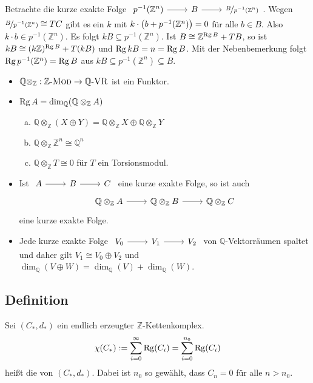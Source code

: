 Betrachte die kurze exakte Folge
$\begin{tikzcd}
	p^{-1}(\mathds{Z}^n) \rar & B \rar & \nicefrac{B}{p ^{-1}(\mathds{Z}^n)}
\end{tikzcd}$. 
Wegen $\nicefrac{B}{p ^{-1}(\mathds{Z}^n)} \cong T C$ gibt es ein
$k$ mit $k \cdot \enbrace*{b+ p ^{-1}(\mathds{Z}^n)} =0$ für alle $b \in B$. Also $k \cdot b \in p ^{-1}(\mathds{Z}^n)$. Es folgt 
$kB \subseteq  p ^{-1}(\mathds{Z}^n)$. Ist  $B \cong \mathds{Z}^{\Rg B}+ TB$, so ist $k B \cong (k \mathds{Z})^{\Rg B}+ T(kB)$ und $\Rg kB = n = \Rg B$. 
Mit der Nebenbemerkung folgt $\Rg p ^{-1}(\mathds{Z}^n) = \Rg B$ aus $kB \subseteq  p ^{-1}(\mathds{Z}^n) \subseteq B$. \bewende
{}
\begin{itemize}
	\item $\mathds{Q} \otimes_\mathds{Z} : \mathds{Z}\text{-}\MOD \to \mathds{Q}\text{-}\VR $ ist ein Funktor.
	\item $\Rg A= \dim_\mathds{Q} (\mathds{Q} \otimes_\mathds{Z} A)$
	\begin{enumerate}[(a)]
		\item $\mathds{Q} \otimes_\mathds{Z} (X \oplus Y) = \mathds{Q} \otimes_\mathds{Z} X \oplus  \mathds{Q} \otimes_\mathds{Z} Y$
		\item $\mathds{Q} \otimes_\mathds{Z} \mathds{Z}^n \cong \mathds{Q}^n$
		\item $\mathds{Q} \otimes_\mathds{Z} T \cong 0$ für $T$ ein Torsionsmodul.
	\end{enumerate}
	\item Ist $\begin{tikzcd}
		A \rar & B \rar & C
	\end{tikzcd}$ eine kurze exakte Folge, so ist auch 
	\[
		\begin{tikzcd}
				\mathds{Q} \otimes_\mathds{Z} A \rar & \mathds{Q} \otimes_\mathds{Z} B \rar & \mathds{Q} \otimes_\mathds{Z} C
			\end{tikzcd}
	\] 
	eine kurze exakte Folge.
	\item Jede kurze exakte Folge $\begin{tikzcd}
		V_0 \rar & V_1 \rar & V_2
	\end{tikzcd}$ von $\mathds{Q}$-Vektorräumen spaltet und daher gilt $V_1 \cong V_0 \oplus V_2$ und $\dim_\mathds{Q}(V \oplus W) = \dim_\mathds{Q}(V)+ \dim_\mathds{Q} (W)$.
\end{itemize}

\subsection[Definition: Eulercharakteristik von $\mathds{Z}$-Kettenkomplexen]{Definition} %
\label{sub:49}
Sei $(C_*,d_*)$ ein endlich erzeugter $\mathds{Z}$-Kettenkomplex.
\[
	\chi(C_*) := \sum_{i=0}^{\infty} \Rg(C_i) = \sum_{i=0}^{n_0} \Rg(C_i) 
\]
heißt die  von $(C_*,d_*)$. Dabei ist $n_0$ so gewählt, dass $C_n =0$ für alle 
$n >n_0$. 

